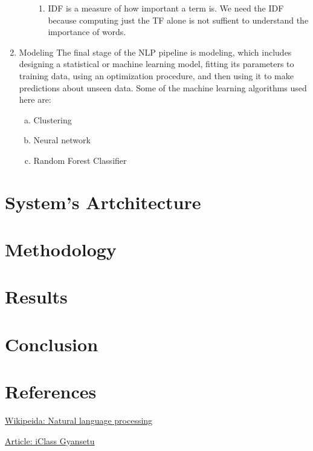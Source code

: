 \documentclass[12pt]{article}
\begin{document}
\begin{enumerate}
\begin{enumerate}[a.]
\begin{enumerate}
                \item[\textbullet] IDF is a measure of how important a term is. We need the IDF because computing just the TF alone is 
                not suffient to understand the importance of words. 
            \end{enumerate}
    
        \end{enumerate}

        \item Modeling
        \newline The final stage of the NLP pipeline is modeling, which includes designing a statistical or machine learning model, 
        fitting its parameters to training data, using an optimization procedure, and then using it to make predictions about unseen data.
        Some of the machine learning algorithms used here are:
        \begin{enumerate}[a.]
            \item Clustering
    
            \item Neural network
            \item Random Forest Classifier
    
        \end{enumerate}

    \end{enumerate}


    
    \section*{System's Artchitecture}

    
    \section*{Methodology}


    
    \section*{Results}


    
    \section*{Conclusion}

    
    \section*{References}


    \begin{thebibliography}{9}
        \href{https://en.wikipedia.org/wiki/Natural_language_processing}{Wikipeida: Natural language processing}

        
        \href{https://www.gyansetu.in/what-is-natural-language-processing/}{Article: iClass Gyansetu}
    \end{thebibliography}
\end{document}
